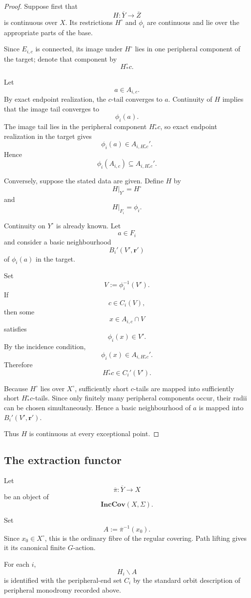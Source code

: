 \documentclass[11pt]{article}
\theoremstyle{plain}
\theoremstyle{definition}
\begin{document}
\begin{proof}
Suppose first that
\[
H:\overline Y\to\overline Z
\]
is continuous over $X$.  Its restrictions $H^\circ$ and $\phi_i$ are
continuous and lie over the appropriate parts of the base.

Since $E_{i,c}$ is connected, its image under $H^\circ$ lies in one
peripheral component of the target; denote that component by
\[
H^\circ_*c.
\]

Let
\[
a\in A_{i,c}.
\]
By exact endpoint realization, the $c$-tail converges to $a$.
Continuity of $H$ implies that the image tail converges to
\[
\phi_i(a).
\]
The image tail lies in the peripheral component $H^\circ_*c$, so exact
endpoint realization in the target gives
\[
\phi_i(a)\in A_{i,H^\circ_*c}'.
\]
Hence
\[
\phi_i(A_{i,c})
\subseteq
A_{i,H^\circ_*c}'.
\]

Conversely, suppose the stated data are given.  Define $H$ by
\[
H|_{Y^\circ}=H^\circ
\]
and
\[
H|_{F_i}=\phi_i.
\]

Continuity on $Y^\circ$ is already known.  Let
\[
a\in F_i
\]
and consider a basic neighbourhood
\[
B_i'(V',\mathbf r')
\]
of $\phi_i(a)$ in the target.

Set
\[
V:=\phi_i^{-1}(V').
\]
If
\[
c\in C_i(V),
\]
then some
\[
x\in A_{i,c}\cap V
\]
satisfies
\[
\phi_i(x)\in V'.
\]
By the incidence condition,
\[
\phi_i(x)
\in
A_{i,H^\circ_*c}'.
\]
Therefore
\[
H^\circ_*c
\in
C_i'(V').
\]

Because $H^\circ$ lies over $X^\circ$, sufficiently short $c$-tails are
mapped into sufficiently short $H^\circ_*c$-tails.  Since only finitely
many peripheral components occur, their radii can be chosen
simultaneously.  Hence a basic neighbourhood of $a$ is mapped into
$B_i'(V',\mathbf r')$.

Thus $H$ is continuous at every exceptional point.
\end{proof}

\subsection{The extraction functor}
\label{subsec:extraction-functor}

Let
\[
\overline\pi:\overline Y\to X
\]
be an object of
\[
\mathbf{IncCov}(X,\Sigma).
\]

Set
\[
A:=\overline\pi^{-1}(x_0).
\]
Since $x_0\in X^\circ$, this is the ordinary fibre of the regular
covering.  Path lifting gives it its canonical finite $G$-action.

For each $i$,
\[
H_i\backslash A
\]
is identified with the peripheral-end set $C_i$ by the standard orbit description of peripheral monodromy recorded above.
\end{document}
